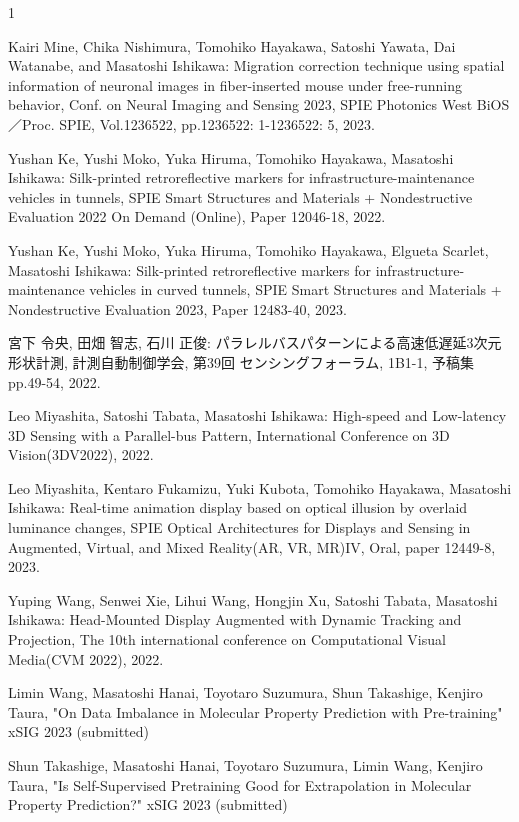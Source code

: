 \begin{査読付}{1}


Kairi Mine, Chika Nishimura, Tomohiko Hayakawa, Satoshi Yawata, Dai Watanabe, and Masatoshi Ishikawa: Migration correction technique using spatial information of neuronal images in fiber-inserted mouse under free-running behavior, Conf. on Neural Imaging and Sensing 2023, SPIE Photonics West BiOS／Proc. SPIE, Vol.1236522, pp.1236522: 1-1236522: 5, 2023.

Yushan Ke, Yushi Moko, Yuka Hiruma, Tomohiko Hayakawa, Masatoshi Ishikawa: Silk-printed retroreflective markers for infrastructure-maintenance vehicles in tunnels, SPIE Smart Structures and Materials + Nondestructive Evaluation 2022 On Demand (Online), Paper 12046-18, 2022.

Yushan Ke, Yushi Moko, Yuka Hiruma, Tomohiko Hayakawa, Elgueta Scarlet, Masatoshi Ishikawa: Silk-printed retroreflective markers for infrastructure-maintenance vehicles in curved tunnels, SPIE Smart Structures and Materials + Nondestructive Evaluation 2023, Paper 12483-40, 2023.


宮下 令央, 田畑 智志, 石川 正俊: パラレルバスパターンによる高速低遅延3次元形状計測, 計測自動制御学会, 第39回 センシングフォーラム, 1B1-1, 予稿集 pp.49-54, 2022.

Leo Miyashita, Satoshi Tabata, Masatoshi Ishikawa: High-speed and Low-latency 3D Sensing with a Parallel-bus Pattern, International Conference on 3D Vision(3DV2022), 2022.

Leo Miyashita, Kentaro Fukamizu, Yuki Kubota, Tomohiko Hayakawa, Masatoshi Ishikawa: Real-time animation display based on optical illusion by overlaid luminance changes, SPIE Optical Architectures for Displays and Sensing in Augmented, Virtual, and Mixed Reality(AR, VR, MR)IV, Oral, paper 12449-8, 2023.


Yuping Wang, Senwei Xie, Lihui Wang, Hongjin Xu, Satoshi Tabata, Masatoshi Ishikawa: Head-Mounted Display Augmented with Dynamic Tracking and Projection, The 10th international conference on Computational Visual Media(CVM 2022), 2022.


Limin Wang, Masatoshi Hanai, Toyotaro Suzumura, Shun Takashige, Kenjiro Taura, "On Data Imbalance in Molecular Property Prediction with Pre-training" xSIG 2023 (submitted)

Shun Takashige, Masatoshi Hanai, Toyotaro Suzumura, Limin Wang, Kenjiro Taura, "Is Self-Supervised Pretraining Good for Extrapolation in Molecular Property Prediction?" xSIG 2023 (submitted)


\end{査読付}
